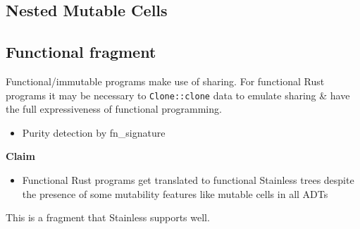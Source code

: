 \subsection{Nested Mutable Cells}




\subsection{Functional fragment}

Functional/immutable programs make use of sharing. For functional Rust
programs it may be necessary to \passthrough{\lstinline!Clone::clone!}
data to emulate sharing \& have the full expressiveness of functional
programming.

\begin{itemize}
\tightlist
\item
  Purity detection by fn\_signature
\end{itemize}

\textbf{Claim}

\begin{itemize}
\tightlist
\item
  Functional Rust programs get translated to functional Stainless trees
  despite the presence of some mutability features like mutable cells in
  all ADTs
\end{itemize}

This is a fragment that Stainless supports well.
